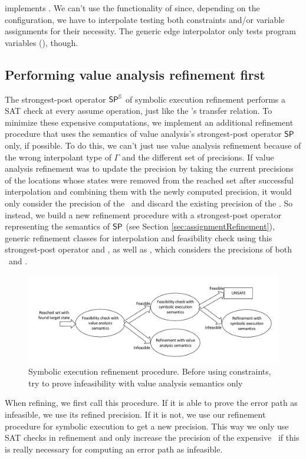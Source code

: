  implements .
We can't use the functionality of  since, depending on the configuration, we have to interpolate
testing both constraints and/or variable assignments for their necessity.
The generic edge interpolator only tests program variables (), though.

\subsection{Performing value analysis refinement first}
The strongest-post operator $\operatorname{\operatorname{\operatorname{\mathsf{SP}}}^{\mathbb{S}}}$ of symbolic execution refinement performs a SAT check at every assume operation, just like the \symbolicExecutionCPA's transfer relation.
To minimize these expensive computations, we implement an additional refinement procedure that uses the semantics of value analysis's strongest-post operator $\operatorname{\operatorname{\operatorname{\mathsf{SP}}}}$ only, if possible.
To do this, we can't just use value analysis refinement because of the wrong interpolant type of $\Gamma$ and the different set of precisions.
If value analysis refinement was to update the precision by taking the current precisions of the locations whose states were removed from the reached set after successful interpolation and combining them with the newly computed precision, it would only consider the precision of the \ and discard the existing precision of the \constraintsCPA.
So instead, we build a new refinement procedure with a strongest-post operator representing the semantics of $\operatorname{\operatorname{\operatorname{\mathsf{SP}}}}$ (see Section \ref{sec:assignmentRefinement}),  generic refinement classes for interpolation and feasibility check using this strongest-post operator and , as well as , which considers the precisions of both \ and \constraintsCPA.

\begin{figure}[t!]
\includegraphics[width=\linewidth]{implementationCegar/DelegatingRefinementFlow}
\caption{Symbolic execution refinement procedure. Before using constraints, try to prove infeasibility with value analysis semantics only}
\label{fig:delegatingRefFlow}
\end{figure}
When refining, we first call this procedure. If it is able to prove the error path as infeasible, we use its refined precision.
If it is not, we use our refinement procedure for symbolic execution to get a new precision.
This way we only use SAT checks in refinement and only increase the precision of the expensive \constraintsCPA\ if this is really necessary for computing an error path as infeasible.

